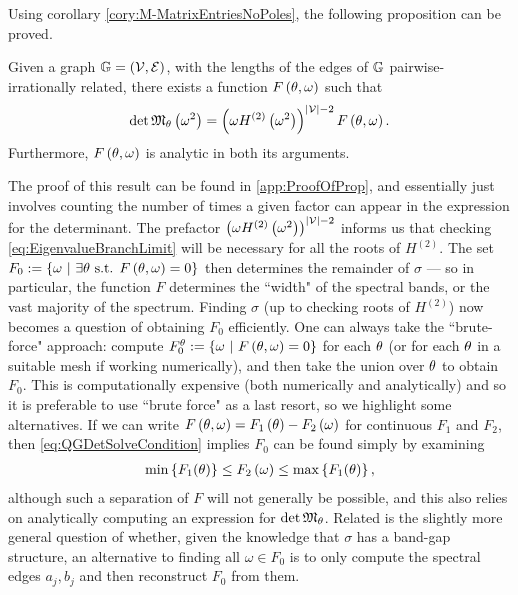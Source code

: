 Using corollary \ref{cory:M-MatrixEntriesNoPoles}, the following proposition can be proved.
\begin{prop} \label{prop:MMatrixDetForm}
	Given a graph $\mathbb{G} = \left( \mathcal{V}, \mathcal{E} \right)$, with the lengths of the edges of $\mathbb{G}$ pairwise-irrationally related, there exists a function $F\left( \theta,\omega \right)$ such that
	\begin{align} \label{eq:MMatrixDetForm}
		\det\mathfrak{M}_\theta\left( \omega^2 \right) = \left(  \omega H^{(2)}\left( \omega^2 \right)  \right)^{\left\lvert \mathcal{V} \right\rvert-2} F\left( \theta,\omega \right).
	\end{align}
	Furthermore, $F\left( \theta,\omega \right)$ is analytic in both its arguments.
\end{prop}
The proof of this result can be found in \ref{app:ProofOfProp}, and essentially just involves counting the number of times a given factor can appear in the expression for the determinant.
The prefactor $\left(  \omega H^{(2)}\left( \omega^2 \right)  \right)^{\left\lvert \mathcal{V} \right\rvert-2}$ informs us that checking \eqref{eq:EigenvalueBranchLimit} will be necessary for all the roots of $H^{(2)}$.
The set $F_0 := \left\{ \omega \ \middle\vert \  \exists\theta \text{ s.t. }F\left( \theta, \omega \right)=0 \right\}$ then determines the remainder of $\sigma$ --- so in particular, the function $F$ determines the ``width" of the spectral bands, or the vast majority of the spectrum.
Finding $\sigma$ (up to checking roots of $H^{(2)}$) now becomes a question of obtaining $F_0$ efficiently.
One can always take the ``brute-force" approach: compute $F_0^{\theta} := \left\{ \omega \ \middle\vert \  F\left( \theta, \omega \right)=0 \right\}$ for each $\theta$ (or for each $\theta$ in a suitable mesh if working numerically), and then take the union over $\theta$ to obtain $F_0$.
This is computationally expensive (both numerically and analytically) and so it is preferable to use ``brute force" as a last resort, so we highlight some alternatives.
If we can write $F\left( \theta,\omega \right) = F_1\left( \theta \right) - F_2\left( \omega \right)$ for continuous $F_1$ and $F_2$, then \eqref{eq:QGDetSolveCondition} implies $F_0$ can be found simply by examining
\begin{align*}
	\min\left\{ F_1(\theta) \right\} \leq F_2\left( \omega \right) \leq \max\left\{ F_1(\theta) \right\},
\end{align*} 
although such a separation of $F$ will not generally be possible, and this also relies on analytically computing an expression for $\det\mathfrak{M}_\theta$.
Related is the slightly more general question of whether, given the knowledge that $\sigma$ has a band-gap structure, an alternative to finding all $\omega\in F_0$ is to only compute the spectral edges $a_j, b_j$ and then reconstruct $F_0$ from them.
